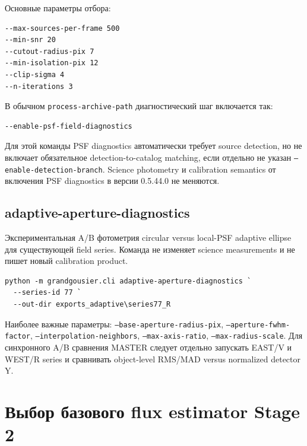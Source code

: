 Основные параметры отбора:
\begin{lstlisting}
--max-sources-per-frame 500
--min-snr 20
--cutout-radius-pix 7
--min-isolation-pix 12
--clip-sigma 4
--n-iterations 3
\end{lstlisting}

В обычном \texttt{process-archive-path} диагностический шаг включается так:
\begin{lstlisting}
--enable-psf-field-diagnostics
\end{lstlisting}
Для этой команды PSF diagnostics автоматически требует source detection, но не включает
обязательное detection-to-catalog matching, если отдельно не указан
\texttt{--enable-detection-branch}. Science photometry и calibration semantics от включения
PSF diagnostics в версии 0.5.44.0 не меняются.

\subsection{adaptive-aperture-diagnostics}
Экспериментальная A/B фотометрия circular versus local-PSF adaptive ellipse для существующей
field series. Команда не изменяет science measurements и не пишет новый calibration product.

\begin{verbatim}
python -m grandgousier.cli adaptive-aperture-diagnostics `
  --series-id 77 `
  --out-dir exports_adaptive\series77_R
\end{verbatim}

Наиболее важные параметры: \texttt{--base-aperture-radius-pix},
\texttt{--aperture-fwhm-factor}, \texttt{--interpolation-neighbors},
\texttt{--max-axis-ratio}, \texttt{--max-radius-scale}. Для синхронного A/B сравнения MASTER
следует отдельно запускать EAST/V и WEST/R series и сравнивать object-level RMS/MAD versus
normalized detector Y.

\section{Выбор базового flux estimator Stage 2}

